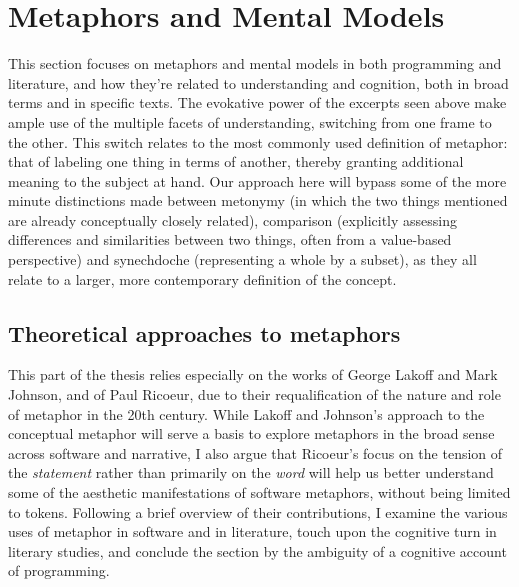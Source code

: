 \documentclass{article}
\begin{document}
\section{Metaphors and Mental Models}

This section focuses on metaphors and mental models in both programming and literature, and how they're related to understanding and cognition, both in broad terms and in specific texts. The evokative power of the excerpts seen above make ample use of the multiple facets of understanding, switching from one frame to the other. This switch relates to the most commonly used definition of metaphor: that of labeling one thing in terms of another, thereby granting additional meaning to the subject at hand. Our approach  here will bypass some of the more minute distinctions made between metonymy (in which the two things mentioned are already conceptually closely related), comparison (explicitly assessing differences and similarities between two things, often from a value-based perspective) and synechdoche (representing a whole by a subset), as they all relate to a larger, more contemporary definition of the concept.

\vspace{1\baselineskip}

\subsection{Theoretical approaches to metaphors}

This part of the thesis relies especially on the works of George Lakoff and Mark Johnson, and of Paul Ricoeur, due to their requalification of the nature and role of metaphor in the 20th century. While Lakoff and Johnson's approach to the conceptual metaphor will serve a basis to explore metaphors in the broad sense across software and narrative, I also argue that Ricoeur's focus on the tension of the \emph{statement} rather than primarily on the \emph{word} will help us better understand some of the aesthetic manifestations of software metaphors, without being limited to tokens. Following a brief overview of their contributions, I examine the various uses of metaphor in software and in literature, touch upon the cognitive turn in literary studies, and conclude the section by the ambiguity of a cognitive account of programming.
\end{document}
